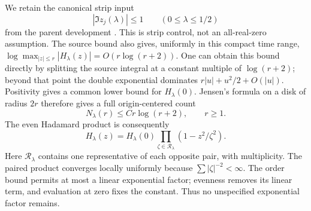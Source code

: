 We retain the canonical strip input
\begin{equation}\label{eq:zero-strip}
 |\Im z_j(\lambda)|\le1\qquad(0\le\lambda\le1/2)
\end{equation}
from the parent development \cite{OGParent,GreenStripProof}.
This is strip control, not an all-real-zero assumption.
The source bound also gives, uniformly in this compact time range,
\(\log\max_{|z|\le r}|H_\lambda(z)|=O(r\log(r+2))\).
One can obtain this bound directly by splitting the source integral
at a constant multiple of \(\log(r+2)\); beyond that point the
double exponential dominates \(r|u|+u^2/2+O(|u|)\).
Positivity gives a common lower bound for \(H_\lambda(0)\).
Jensen's formula on a disk of radius \(2r\) therefore gives a
full origin-centered count
\begin{equation}\label{eq:count}
 N_\lambda(r)\le Cr\log(r+2),\qquad r\ge1.
\end{equation}
The even Hadamard product is consequently
\begin{equation}\label{eq:product}
 H_\lambda(z)=H_\lambda(0)
 \prod_{\zeta\in\mathcal R_\lambda}(1-z^2/\zeta^2).
\end{equation}
Here \(\mathcal R_\lambda\) contains one representative of each
opposite pair, with multiplicity. The paired product converges
locally uniformly because \(\sum|\zeta|^{-2}<\infty\). The order
bound permits at most a linear exponential factor; evenness removes
its linear term, and evaluation at zero fixes the constant.
Thus no unspecified exponential factor remains.

